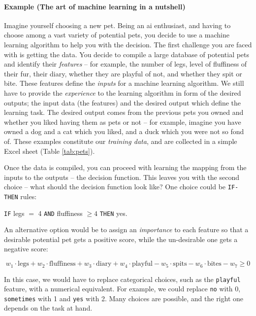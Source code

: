 \paragraph{Example (The art of machine learning in a nutshell)} Imagine yourself choosing a new pet.
Being an \gls{ai} enthusiast, and having to choose among a vast variety of potential pets, you decide to use a machine learning algorithm to help you with the decision.
The first challenge you are faced with  is getting the data.
You decide to compile a large database of potential pets and identify their \textit{features} -- for example, the number of legs, level of fluffiness of their fur, their diary, whether they are playful of not, and whether they spit or bite.
These features define the \textit{inputs} for a machine learning algorithm.
We still have to provide the \textit{experience} to the learning algorithm in form of the desired outputs; the input data (the features) and the desired output which define the learning task.
The desired output comes from the previous pets you owned and whether you liked having them as pets or not -- for example, imagine you have owned a dog and a cat which you liked, and a duck which you were not so fond of.
These examples constitute our \textit{training data}, and are collected in a simple Excel sheet (Table \ref{tab:pets}).






Once the data is compiled, you can proceed with learning the  mapping from the inputs to the outputs -- the decision function.
This leaves you with the second choice -- what should the decision function look like?
One choice could be \texttt{IF-THEN} rules:
\begin{center}
	\texttt{IF} legs $=$ 4 \texttt{AND} fluffiness $\geq 4$ \texttt{THEN} yes.
\end{center}
An alternative option would be to assign an \textit{importance} to each feature so that a desirable potential pet gets a positive score, while the un-desirable one gets a negative score:

{
\small
$$ w_1 \cdot \text{legs} + w_2 \cdot \text{fluffiness} + w_3 \cdot \text{diary} + w_4 \cdot \text{playful} - w_5 \cdot \text{spits} - w_6 \cdot \text{bites} - w_7 \geq 0$$
}

In this case, we would have to replace categorical choices, such as the  \texttt{playful} feature, with a numerical equivalent.
For example, we could replace \texttt{no} with 0, \texttt{sometimes} with 1 and \texttt{yes} with 2.
Many choices are possible, and the right one depends on the task at hand.


